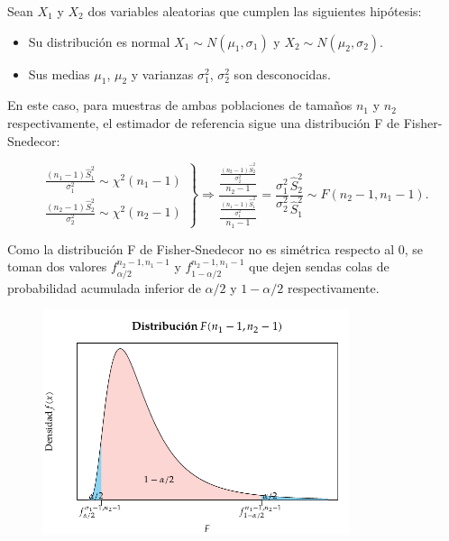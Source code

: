 \documentclass[
  a4paper,
]{scrreport}
\providecommand{\tightlist}{%
  \setlength{\itemsep}{0pt}\setlength{\parskip}{0pt}}\usepackage{longtable,booktabs,array}
\theoremstyle{plain}
\theoremstyle{definition}
\theoremstyle{definition}
\theoremstyle{remark}
\begin{document}
Sean \(X_1\) y \(X_2\) dos variables aleatorias que cumplen las
siguientes hipótesis:

\begin{itemize}
\tightlist
\item
  Su distribución es normal \(X_1\sim N(\mu_1,\sigma_1)\) y
  \(X_2\sim N(\mu_2,\sigma_2)\).
\item
  Sus medias \(\mu_1\), \(\mu_2\) y varianzas \(\sigma_1^2\),
  \(\sigma_2^2\) son desconocidas.
\end{itemize}

En este caso, para muestras de ambas poblaciones de tamaños \(n_1\) y
\(n_2\) respectivamente, el estimador de referencia sigue una
distribución F de Fisher-Snedecor:

\[
\left.
\begin{array}{l}
\displaystyle \frac{(n_1-1)\hat{S}_1^2}{\sigma_1^2}\sim \chi^2(n_1-1) \\
\displaystyle \frac{(n_2-1)\hat{S}_2^2}{\sigma_2^2}\sim \chi^2(n_2-1)
\end{array}
\right\}
\Rightarrow
\frac{\frac{\frac{(n_2-1)\hat{S}_2^2}{\sigma_2^2}}{n_2-1}}{\frac{\frac{(n_1-1)\hat{S}_1^2}{\sigma_1^2}}{n_1-1}} =
\frac{\sigma_1^2}{\sigma_2^2}\frac{\hat{S}_2^2}{\hat{S}_1^2}\sim F(n_2-1,n_1-1).
\]

Como la distribución F de Fisher-Snedecor no es simétrica respecto al 0,
se toman dos valores \(f^{n_2-1,n_1-1}_{\alpha/2}\) y
\(f^{n_2-1,n_1-1}_{1-\alpha/2}\) que dejen sendas colas de probabilidad
acumulada inferior de \(\alpha/2\) y \(1-\alpha/2\) respectivamente.

\begin{figure}

{\centering \includegraphics[width=0.8\textwidth,height=\textheight]{img/estimacion/extremos-intervalo-comparacion-varianzas-normal.pdf}

}

\end{figure}
\end{document}
